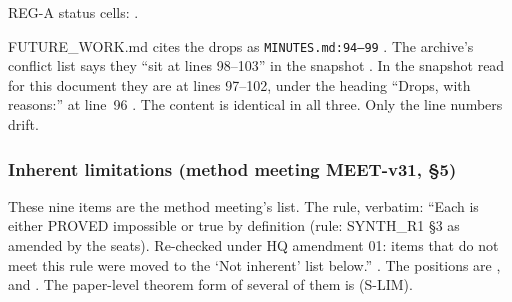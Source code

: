 REG-A status cells: .
\begin{uncertain}
FUTURE\_WORK.md cites the drops as \texttt{MINUTES.md:94–99} . The archive's conflict list says they ``sit at lines 98–103'' in the snapshot . In the snapshot read for this document they are at lines 97--102, under the heading ``Drops, with reasons:'' at line~96 . The content is identical in all three. Only the line numbers drift.
\end{uncertain}

\subsubsection*{Inherent limitations (method meeting MEET-v31, §5)}
These nine items are the method meeting's list. The rule, verbatim: ``Each is either PROVED impossible or true by definition (rule: SYNTH\_R1 §3 as amended by the seats). Re-checked under HQ amendment 01: items that do not meet this rule were moved to the `Not inherent' list below.'' . The positions are ,  and . The paper-level theorem form of several of them is  (S-LIM).

